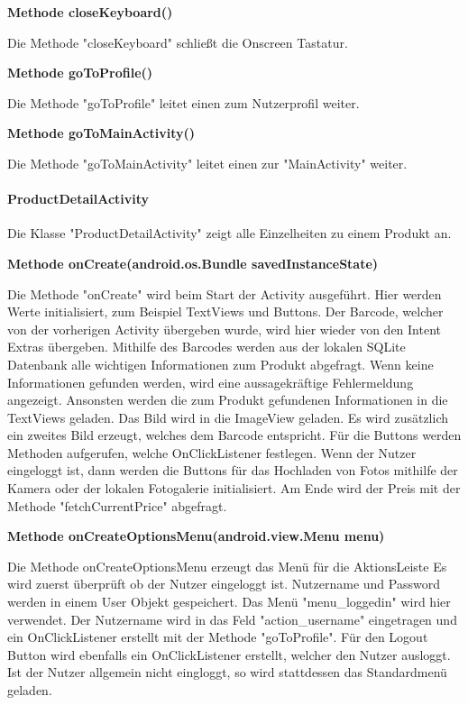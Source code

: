 \documentclass{scrartcl}
\begin{document}
\noindent\textbf{Methode closeKeyboard()} 

\noindent Die Methode "closeKeyboard" schließt die Onscreen Tastatur. \newline 

\noindent\textbf{Methode goToProfile()} 

\noindent Die Methode "goToProfile" leitet einen zum Nutzerprofil weiter. \newline

\noindent\textbf{Methode goToMainActivity()} 

\noindent Die Methode "goToMainActivity" leitet einen zur "MainActivity" weiter. \newline

\newpage

\paragraph{ProductDetailActivity} Die Klasse "ProductDetailActivity" zeigt alle Einzelheiten zu einem Produkt an. \newline

\noindent\textbf{Methode onCreate(android.os.Bundle savedInstanceState)} 

\noindent Die Methode "onCreate" wird beim Start der Activity ausgeführt. Hier werden Werte initialisiert, zum Beispiel TextViews und Buttons. Der Barcode, welcher von der vorherigen Activity übergeben wurde, wird hier wieder von den Intent Extras übergeben. Mithilfe des Barcodes werden aus der lokalen SQLite Datenbank alle wichtigen Informationen zum Produkt abgefragt. Wenn keine Informationen gefunden werden, wird eine aussagekräftige Fehlermeldung angezeigt. Ansonsten werden die zum Produkt gefundenen Informationen in die TextViews geladen. Das Bild wird in die ImageView geladen. Es wird zusätzlich ein zweites Bild erzeugt, welches dem Barcode entspricht. Für die Buttons werden Methoden aufgerufen, welche OnClickListener festlegen. Wenn der Nutzer eingeloggt ist, dann werden die Buttons für das Hochladen von Fotos mithilfe der Kamera oder der lokalen Fotogalerie initialisiert. Am Ende wird der Preis mit der Methode "fetchCurrentPrice" abgefragt. \newline

\noindent\textbf{Methode onCreateOptionsMenu(android.view.Menu menu)} 

\noindent Die Methode onCreateOptionsMenu erzeugt das Menü für die AktionsLeiste Es wird zuerst überprüft ob der Nutzer eingeloggt ist. Nutzername und Password werden in einem User Objekt gespeichert. Das Menü "menu\_loggedin" wird hier verwendet. Der Nutzername wird in das Feld "action\_username" eingetragen und ein OnClickListener erstellt mit der Methode "goToProfile". Für den Logout Button wird ebenfalls ein OnClickListener erstellt, welcher den Nutzer ausloggt. Ist der Nutzer allgemein nicht eingloggt, so wird stattdessen das Standardmenü geladen. \newline
\end{document}
